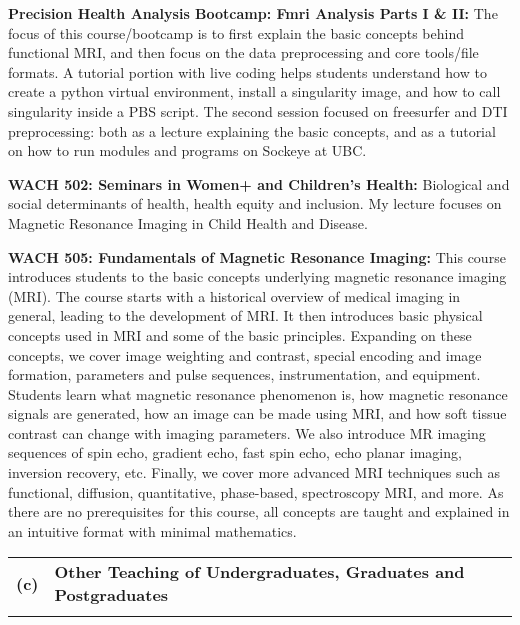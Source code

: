 \documentclass[11pt,notitlepage,english]{report}
\begin{document}
\vspace{5pt}

\textbf{Precision Health Analysis Bootcamp: Fmri Analysis Parts I \& II:} The focus of this course/bootcamp is to first explain the basic concepts behind functional MRI, and then focus on the data preprocessing and core tools/file formats. A tutorial portion with live coding helps students understand how to create a python virtual environment, install a singularity image, and how to call singularity inside a PBS script. The second session focused on freesurfer and DTI preprocessing: both as a lecture explaining the basic concepts, and as a tutorial on how to run modules and programs on Sockeye at UBC.

\vspace{5pt}

\textbf{WACH 502: Seminars in Women+ and Children's Health:} Biological and social determinants of health, health equity and inclusion. My lecture focuses on Magnetic Resonance Imaging in Child Health and Disease.

\vspace{5pt}

\textbf{WACH 505: Fundamentals of Magnetic Resonance Imaging:} This course introduces students to the basic concepts underlying magnetic resonance imaging (MRI). The course starts with a historical overview of medical imaging in general, leading to the development of MRI. It then introduces basic physical concepts used in MRI and some of the basic principles. Expanding on these concepts, we cover image weighting and contrast, special encoding and image formation, parameters and pulse sequences, instrumentation, and equipment. Students learn what magnetic resonance phenomenon is, how magnetic resonance signals are generated, how an image can be made using MRI, and how soft tissue contrast can change with imaging parameters. We also introduce MR imaging sequences of spin echo, gradient echo, fast spin echo, echo planar imaging, inversion recovery, etc. Finally, we cover more advanced MRI techniques such as functional, diffusion, quantitative, phase-based, spectroscopy MRI, and more. As there are no prerequisites for this course, all concepts are taught and explained in an intuitive format with minimal mathematics.


\begin{tabular}{L{.5cm} L{8cm} L{6.9cm}}
  \\
  \textbf{(c)} & \textbf{Other Teaching of Undergraduates, Graduates and Postgraduates} \\
  \\
\end{tabular}
\end{document}
